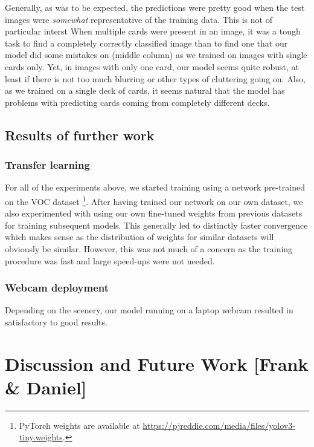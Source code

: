 \documentclass[a4paper]{article}
\begin{document}
Generally, as was to be expected, the predictions were pretty good when the test images were \textit{somewhat} representative of the training data. This is not of particular interst
When multiple cards were present in an image, it was a tough task to find a completely correctly classified image than to find one that our model did some mistakes on (middle column) as we trained on images with single cards only. Yet, in images with only one card, our model seems quite robust, at least if there is not too much blurring or other types of cluttering going on. Also, as we trained on a single deck of cards, it seems natural that the model has problems with predicting cards coming from completely different decks.
\subsection*{Results of further work}
\subsubsection*{Transfer learning}
For all of the experiments above, we started training using a network pre-trained on the VOC dataset \cite{Everingham15}\footnote{PyTorch weights are available at \url{https://pjreddie.com/media/files/yolov3-tiny.weights}.}. After having trained our network on our own dataset, we also experimented with using our own fine-tuned weights from previous datasets for training subsequent models. This generally led to distinctly faster convergence which makes sense as the distribution of weights for similar datasets will obviously be similar. However, this was not much of a concern as the training procedure was fast and large speed-ups were not needed.
\subsubsection*{Webcam deployment}
Depending on the scenery, our model running on a laptop webcam resulted in satisfactory to good results.
\section{Discussion and Future Work  [Frank \& Daniel]}
\end{document}
